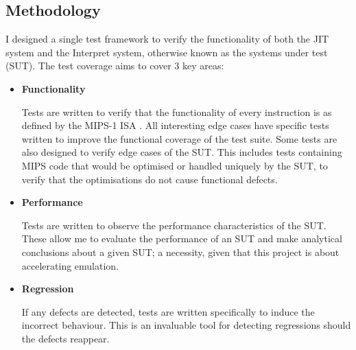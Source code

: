 \subsection{Methodology}

I designed a single test framework to verify the functionality of both the JIT system and the Interpret system, otherwise known as the systems under test (SUT). The test coverage aims to cover 3 key areas:

\begin{itemize}
    \item \textbf{Functionality}
    
    Tests are written to verify that the functionality of every instruction is as defined by the MIPS-1 ISA \cite{mips-1-isa}. All interesting edge cases have specific tests written to improve the functional coverage of the test suite. Some tests are also designed to verify edge cases of the SUT. This includes tests containing MIPS code that would be optimised or handled uniquely by the SUT, to verify that the optimisations do not cause functional defects.
    
    \item \textbf{Performance}
    
    Tests are written to observe the performance characteristics of the SUT. These allow me to evaluate the performance of an SUT and make analytical conclusions about a given SUT; a necessity, given that this project is about accelerating emulation.
    
    \item \textbf{Regression}
    
    If any defects are detected, tests are written specifically to induce the incorrect behaviour. This is an invaluable tool for detecting regressions should the defects reappear.
\end{itemize}